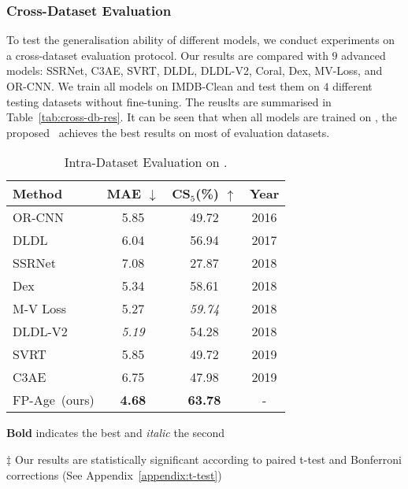\subsubsection{Cross-Dataset Evaluation} To test the generalisation ability of different models, we conduct experiments on a cross-dataset evaluation protocol. Our results are compared with $9$ advanced models: SSRNet, C3AE, SVRT, DLDL, DLDL-V2, Coral, Dex, MV-Loss, and OR-CNN. We train all models on IMDB-Clean and test them on $4$ different testing datasets without fine-tuning. The reuslts are summarised in Table~\ref{tab:cross-db-res}. It can be seen that when all models are trained on \imdbc, the proposed \fpage~achieves the best results on most of evaluation datasets.
\begin{table}[tb] 
	\caption{Intra-Dataset Evaluation on \imdbc.}\label{tab:imdb-clean-results}
	\begin{center}
    	\begin{threeparttable}
    		\begin{tabular}{l|c|c|c}
    			\toprule
    			{Method} & {MAE} $\downarrow$  & {CS$_5$(\%)} $\uparrow$ & {Year}\\
    			\midrule
    			\midrule
    	    	OR-CNN~\cite{niuOrdinalRegressionMultiple2016} & 5.85
& 49.72 & 2016 \\		
    			DLDL~\cite{gaoDeepLabelDistribution2017}  & 6.04 & 56.94 & 2017 \\
    			SSRNet~\cite{ssrnet2018} &7.08 & 27.87 & 2018 \\
    			Dex~\cite{rotheDeepExpectationReal2018}  & 5.34 & 58.61 & 2018 \\
    			M-V Loss\cite{panMeanVarianceLossDeep2018} & 5.27 & \textit{59.74} & 2018 \\
    		    DLDL-V2~\cite{gaoAgeEstimationUsing2018}  & \textit{5.19} & 54.28 & 2018 \\
    			SVRT~\cite{imScaleVaryingTripletRanking2019} & 5.85 & 49.72 & 2019 \\
    			C3AE~\cite{zhangC3AEExploringLimits2019} &6.75 & 47.98 & 2019 \\
    			\midrule
    			FP-Age~(ours) & \textbf{4.68}\tnote{$\ddagger$} & \textbf{63.78} &{-} \\
    			\bottomrule
    		\end{tabular}
    	
	
    	\begin{tablenotes}
    	\item \textbf{Bold} indicates the best and \textit{italic} the second
    	\item $\ddagger$ Our results are statistically significant according to paired t-test and Bonferroni corrections (See Appendix~\ref{appendix:t-test})
    	\end{tablenotes}
    	\end{threeparttable}
	\end{center}
\end{table}


